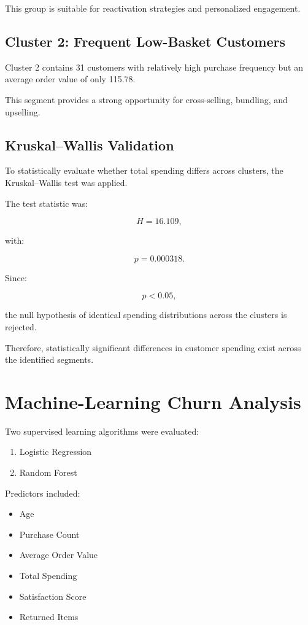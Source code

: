 \documentclass[11pt,a4paper]{article}
\begin{document}
This group is suitable for reactivation strategies and personalized engagement.

\subsection{Cluster 2: Frequent Low-Basket Customers}

Cluster 2 contains 31 customers with relatively high purchase frequency but an average order value of only 115.78.

This segment provides a strong opportunity for cross-selling, bundling, and upselling.

\subsection{Kruskal--Wallis Validation}

To statistically evaluate whether total spending differs across clusters, the Kruskal--Wallis test was applied.

The test statistic was:

\[
H=16.109,
\]

with:

\[
p=0.000318.
\]

Since:

\[
p<0.05,
\]

the null hypothesis of identical spending distributions across the clusters is rejected.

Therefore, statistically significant differences in customer spending exist across the identified segments.


\section{Machine-Learning Churn Analysis}

Two supervised learning algorithms were evaluated:

\begin{enumerate}
    \item Logistic Regression
    \item Random Forest
\end{enumerate}

Predictors included:

\begin{itemize}
    \item Age
    \item Purchase Count
    \item Average Order Value
    \item Total Spending
    \item Satisfaction Score
    \item Returned Items
\end{itemize}
\end{document}
